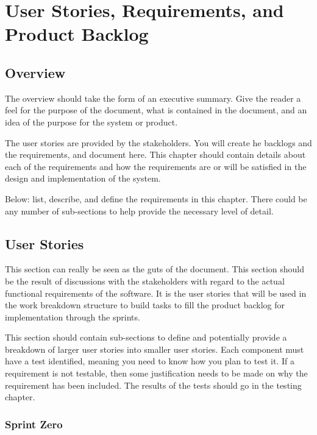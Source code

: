 
\chapter{User Stories,  Requirements, and Product Backlog}
\section{Overview}


The overview should take the form of an executive summary.  Give the reader a feel 
for the purpose of the document, what is contained in the document, and an idea 
of the purpose for the system or product. 

 The user stories 
are provided by the stakeholders.  You will create he backlogs and the requirements, and document here.  
This chapter should contain 
details about each of the requirements and how the requirements are or will be 
satisfied in the design and implementation of the system.

Below:   list, describe, and define the requirements in this chapter.  
There could be any number of sub-sections to help provide the necessary level of 
detail. 




\section{User Stories}
This section can really be seen as the guts of the document.  This section should 
be the result of discussions with the stakeholders with regard to the actual functional 
requirements of the software.  It is the user stories that will be used in the 
work breakdown structure to build tasks to fill the product backlog for implementation 
through the sprints.

This section should contain sub-sections to define and potentially provide a breakdown 
of larger user stories into smaller user stories.   Each component must have a test identified, 
meaning you need to know how you plan to test it.  If a requirement is not testable, then 
some justification needs to be made on why the requirement has been included.  
 The results of the tests should go in the testing chapter. 



\subsection{Sprint Zero}

